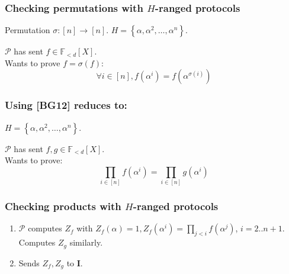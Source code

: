 \documentclass[shadesubsections,trans,14pt,mathserif]{beamer}
\newcommand{\F}{\ensuremath{\mathbb F}}
\newcommand{\set}[1]{\ensuremath{\left\{#1\right\}}}
\newcommand{\prv}{\ensuremath{\mathcal{P}}}
\newcommand{\polysofdeg}[1]{\F_{< #1}[X]}
\newcommand{\ideal}{\mathbf{I}}
\newcommand{\gen}{\alpha}
\begin{document}
\begin{frame}
\frametitle{Checking permutations with $H$-ranged protocols}   %
 Permutation $\sigma: [n]\to [n]$.
 $H=\set{\gen,\gen^2,\ldots,\gen^n}$.\\
 \vspace{0.2in}
 
 $\prv$ has sent $f\in \polysofdeg{d}$.\\
 \vspace{0.2in}
 Wants to prove $f=\sigma(f)$:
 \[\forall i\in [n], f(\gen^i) = f(\gen^{\sigma(i)})\]

 

\end{frame}
\begin{frame}
\frametitle{Using [BG12] reduces to:}   %
 $H=\set{\gen,\gen^2,\ldots,\gen^n}$.\\
 \vspace{0.2in}
 
 $\prv$ has sent $f,g\in \polysofdeg{d}$.\\
 \vspace{0.2in}
 Wants to prove:
 \[\prod_{i\in [n]}  f(\gen^i) = \prod_{i\in [n]} g(\gen^i)\]

 

\end{frame}




\begin{frame}
\frametitle{Checking products with $H$-ranged protocols}   %
 \begin{enumerate}
  \item $\prv$ computes $Z_f$ with 
  $ Z_f(\gen)=1, Z_f(\gen^i) = \prod_{j<i}  f(\gen^j)$, {\small{$i=2..n+1$}}.
  Computes $Z_g$ similarly.
  \item Sends $Z_f,Z_g$ to $\ideal$.

 \end{enumerate}


\end{frame}
\end{document}

